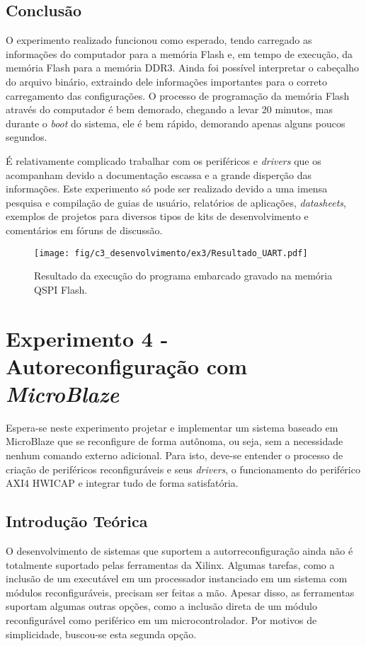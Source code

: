 \documentclass[11pt,a4paper,oneside]{book}
\begin{document}
\section{Conclusão}
O experimento realizado funcionou como esperado, tendo carregado as informações do computador para a memória Flash e, em tempo de execução, da memória Flash para a memória DDR3.
Ainda foi possível interpretar o cabeçalho do arquivo binário, extraindo dele informações importantes para o correto carregamento das configurações.
O processo de programação da memória Flash através do computador é bem demorado, chegando a levar 20 minutos, mas durante o \textit{boot} do sistema, ele é bem rápido, demorando apenas alguns poucos segundos.

É relativamente complicado trabalhar com os periféricos e \textit{drivers} que os acompanham devido a documentação escassa e a grande disperção das informações.
Este experimento só pode ser realizado devido a uma imensa pesquisa e compilação de guias de usuário, relatórios de aplicações, \textit{datasheets}, exemplos de projetos para diversos tipos de kits de desenvolvimento e comentários em fóruns de discussão.

\begin{figure}[htp]
\centering
\texttt{[image: fig/c3\_desenvolvimento/ex3/Resultado\_UART.pdf]}
\caption{Resultado da execução do programa embarcado gravado na memória QSPI Flash.}
\label{fig:ex3:resultado}
\end{figure}


\chapter{Experimento 4 - Autoreconfiguração com \textit{MicroBlaze}}
Espera-se neste experimento projetar e implementar um sistema baseado em MicroBlaze que se reconfigure de forma autônoma, ou seja, sem a necessidade nenhum comando externo adicional.
Para isto, deve-se entender o processo de criação de periféricos reconfiguráveis e seus \textit{drivers}, o funcionamento do periférico AXI4 HWICAP e integrar tudo de forma satisfatória.

\section{Introdução Teórica}
O desenvolvimento de sistemas que suportem a autorreconfiguração ainda não é totalmente suportado pelas ferramentas da Xilinx.
Algumas tarefas, como a inclusão de um executável em um processador instanciado em um sistema com módulos reconfiguráveis, precisam ser feitas a mão.
Apesar disso, as ferramentas suportam algumas outras opções, como a inclusão direta de um módulo reconfigurável como periférico em um microcontrolador.
Por motivos de simplicidade, buscou-se esta segunda opção.
\end{document}
